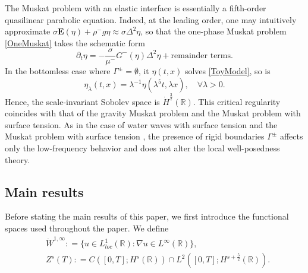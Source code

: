 \documentclass[12pt]{amsart}
\theoremstyle{definition}
\numberwithin{equation}{section}
\newcommand{\p}{\partial}
\newcommand{\R}{\mathbb{R}}
\newcommand{\f}{\frac}
\begin{document}
The Muskat problem with an elastic interface is essentially a fifth-order quasilinear parabolic equation.
Indeed, at the leading order, one may intuitively approximate $\sigma \mathbf{E}(\eta) + \rho^- g\eta\approx \sigma  \Delta^2 \eta$, so that the one-phase Muskat problem \eqref{OneMuskat} takes the schematic form
\begin{equation} \label{ToyModel}
     \p_t \eta = -\frac{\sigma}{\mu^-}G^-(\eta)\Delta^2 \eta + \text{remainder terms}.
\end{equation}
In the bottomless case where $\Gamma^\pm = \emptyset$, it $\eta(t,x)$ solves \eqref{ToyModel}, so is 
\begin{equation*}
    \eta_\lambda (t,x) = \lambda^{-1}\eta(\lambda^5 t, \lambda x), \quad \forall \lambda >0.
\end{equation*}
Hence, the scale-invariant Sobolev space is $\dot{H}^\f32(\R)$.
This critical regularity coincides with that of the gravity Muskat problem and the Muskat problem with surface tension.
As in the case of water waves with surface tension \cite{MR2805065} and the Muskat problem with surface tension \cite{MR4131404}, the presence of rigid boundaries $\Gamma^\pm$ affects only the low-frequency behavior and does not alter the local well-posedness theory.

\subsection{Main results}
Before stating the main results of this paper, we first introduce the functional spaces used throughout the paper.
We define
\begin{align*}
    &\dot{W}^{1,\infty} : = \{u\in L^1_{loc}(\R) : \nabla u \in L^\infty(\R)  \}, \\
    & Z^s(T) : = C([0,T]; H^s(\R)) \cap L^2([0,T]; H^{s+\f52}(\R)).
\end{align*}
\end{document}

